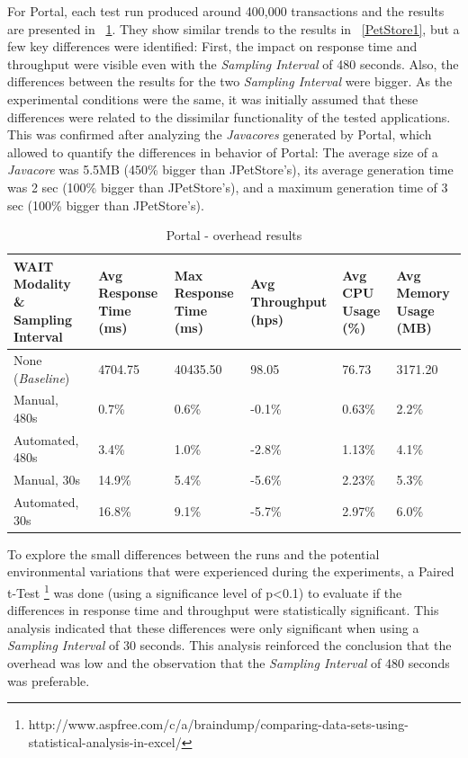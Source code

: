 \documentclass[runningheads,a4paper]{llncs}
\begin{document}
For Portal, each test run produced around 400,000 transactions and the
results are presented in \tablename ~\ref{Portal1}. They show similar trends
to the results in \tablename ~\ref{PetStore1}, but a few
key differences were identified: First, the impact on response time and
throughput were visible even with the \emph{Sampling Interval} of 480 seconds.
Also, the differences between the results for the two \emph{Sampling Interval}
were bigger. As the experimental conditions were the same, it was initially
assumed that these differences were related to the dissimilar functionality of the 
tested applications. This was confirmed after analyzing the \emph{Javacores} generated 
by Portal, which allowed to quantify the differences in behavior of Portal: The
average size of a \emph{Javacore} was 5.5MB (450\% bigger than JPetStore's), its
average generation time was 2 sec (100\% bigger than JPetStore's), and a
maximum generation time of 3 sec (100\% bigger than JPetStore's).

\begin{table}[!h]
\caption{Portal - overhead results}
\label{Portal1}
\centering
\begin{tabular}{p{}|p{}|p{}|p{}|p{}|p{}}
\hline
\bfseries WAIT Modality \& Sampling Interval & \bfseries Avg Response Time (ms)&
\bfseries Max Response Time (ms)& \bfseries Avg Throughput (hps)& \bfseries Avg CPU Usage
(\%) & \bfseries Avg Memory Usage (MB)\\
\hline
None (\emph{Baseline}) 	& 4704.75	& 40435.50	& 98.05 	& 76.73 	& 3171.20\\
Manual, 480s 			& 0.7\% 	& 0.6\%		& -0.1\%	& 0.63\% 	& 2.2\%\\
Automated, 480s 		& 3.4\%		& 1.0\%		& -2.8\% 	& 1.13\% 	& 4.1\%\\
Manual, 30s 			& 14.9\%	& 5.4\%		& -5.6\% 	& 2.23\% 	& 5.3\%\\
Automated, 30s 			& 16.8\%	& 9.1\%		& -5.7\% 	& 2.97\% 	& 6.0\%\\
\hline
\end{tabular}
\end{table}

To explore the small differences between the runs and the potential
environmental variations that were experienced during the experiments, a Paired
t-Test
\footnote{http://www.aspfree.com/c/a/braindump/comparing-data-sets-using-statistical-analysis-in-excel/}
 was done (using a significance level of p\textless0.1) to evaluate if the
differences in response time and throughput were statistically significant.
This analysis indicated that these differences were only significant when
using a \emph{Sampling Interval} of 30 seconds. This analysis reinforced 
the conclusion that the overhead was low and the observation that the
\emph{Sampling Interval} of 480 seconds was preferable.
\end{document}
